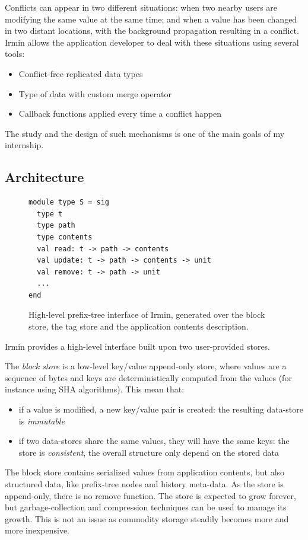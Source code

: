 \documentclass{article}
\newcommand{\irmin}{Irmin\xspace}
\begin{document}
Conflicts can appear in two different situations:
when two nearby users are modifying the same value at the same time;
and when a value has been changed in two distant locations, with the background propagation resulting in a conflict.
\irmin allows the application developer to deal with these situations using several tools:
\begin{itemize}
	\item Conflict-free replicated data types\cite{ConflictfreeReplicatedDataTypes2011}
	\item Type of data with custom merge operator
	\item Callback functions applied every time a conflict happen
\end{itemize}
The study and the design of such mechanisms is one of the main goals of my internship.


\subsection{Architecture}

\begin{figure}[hbt]
\begin{lstlisting}
module type S = sig
  type t
  type path
  type contents
  val read: t -> path -> contents
  val update: t -> path -> contents -> unit
  val remove: t -> path -> unit
  ...
end
\end{lstlisting}
\caption{High-level prefix-tree interface of \irmin, generated over the block store, the tag store and the application contents description.}
\label{prefixtreesig}
\end{figure}

\irmin provides a high-level interface built upon two user-provided stores.

The \emph{block store} is a low-level key/value append-only store, where values are a sequence of bytes and keys are deterministically computed from the values (for instance using SHA algorithms).
This mean that:
\begin{itemize}
	\item if a value is modified, a new key/value pair is created: the resulting data-store is \emph{immutable}
	\item if two data-stores share the same values, they will have the same keys: the store is \emph{consistent}, the overall structure only depend on the stored data
\end{itemize}
The block store contains serialized values from application contents, but also structured data, like prefix-tree nodes and history meta-data.
As the store is append-only, there is no remove function.
The store is expected to grow forever, but garbage-collection and compression techniques can be used to manage its growth.
This is not an issue as commodity storage steadily becomes more and more inexpensive.
\end{document}
